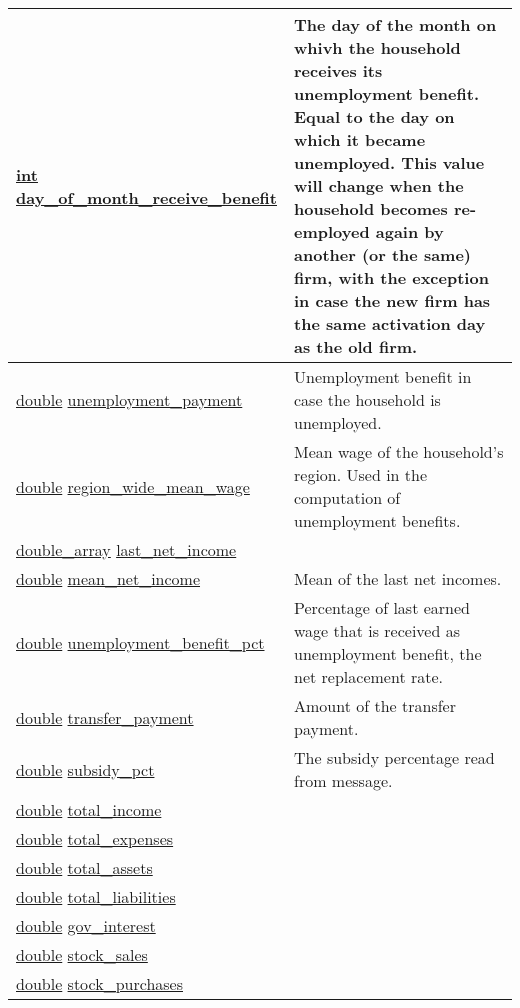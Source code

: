 \documentclass[a4paper,11pt]{article}
\begin{document}
\begin{landscape}
\begin{longtable}[H!]{ll}
\midrule
\url{int} \url{day_of_month_receive_benefit} \index{\url{day_of_month_receive_benefit}} & \parbox{10cm}{The day of the month on whivh the household receives its unemployment benefit. Equal to the day on which it became unemployed. This value will change when the household becomes re-employed again by another (or the same) firm, with the exception in case the new firm has the same activation day as the old firm.} \\
\midrule
\url{double} \url{unemployment_payment}  & \parbox{10cm}{Unemployment benefit in case the household is unemployed.} \\
\midrule
\url{double} \url{region_wide_mean_wage}  & \parbox{10cm}{Mean wage of the household's region. Used in the computation of unemployment benefits.} \\
\midrule
\url{double_array} \url{last_net_income}  & \parbox{10cm}{} \\
\midrule
\url{double} \url{mean_net_income}  & \parbox{10cm}{Mean of the last net incomes.} \\
\midrule
\url{double} \url{unemployment_benefit_pct}  & \parbox{10cm}{Percentage of last earned wage that is received as unemployment benefit, the net replacement rate.} \\
\midrule
\url{double} \url{transfer_payment}  & \parbox{10cm}{Amount of the transfer payment.} \\
\midrule
\url{double} \url{subsidy_pct}  & \parbox{10cm}{The subsidy percentage read from message.} \\
\midrule
\url{double} \url{total_income}  & \parbox{10cm}{} \\
\midrule
\url{double} \url{total_expenses}  & \parbox{10cm}{} \\
\midrule
\url{double} \url{total_assets}  & \parbox{10cm}{} \\
\midrule
\url{double} \url{total_liabilities}  & \parbox{10cm}{} \\
\midrule
\url{double} \url{gov_interest}  & \parbox{10cm}{} \\
\midrule
\url{double} \url{stock_sales}  & \parbox{10cm}{} \\
\midrule
\url{double} \url{stock_purchases}  & \parbox{10cm}{} \\

\end{longtable}
\end{landscape}
\end{document}
